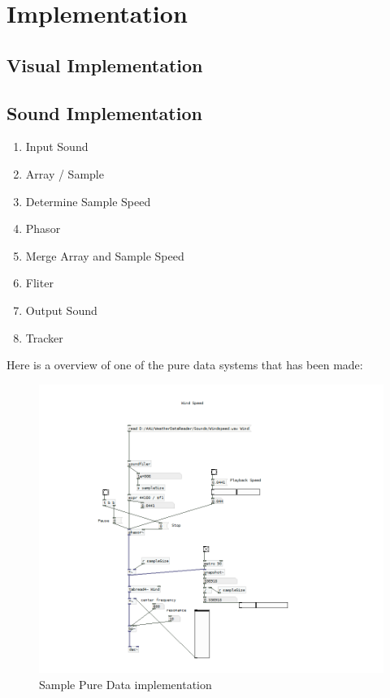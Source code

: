 
\section{Implementation} %
\label{sec:implementation}


\subsection{Visual Implementation} %
\label{sub:visual_implementation}



\subsection{Sound Implementation} %
\label{sub:sound_implementation}

\begin{enumerate}
    \item Input Sound
    \item Array / Sample
    \item Determine Sample Speed
    \item Phasor
    \item Merge Array and Sample Speed
    \item Fliter
    \item Output Sound
    \item Tracker
\end{enumerate}

Here is a overview of one of the pure data systems that has been made:

\begin{figure}[!htbp]
    \centering
    \includegraphics[width=1\textwidth]{images/Implementation1.png}
    \caption{Sample Pure Data implementation}
    \label{fig:implementation1}
\end{figure}


